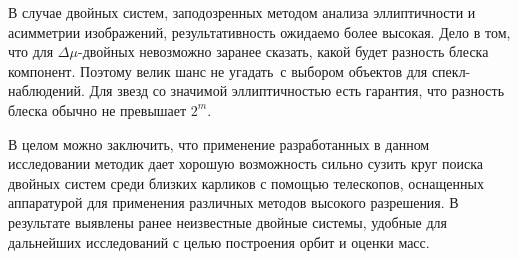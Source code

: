 В случае двойных систем, заподозренных методом анализа эллиптичности и асимметрии изображений, результативность ожидаемо более высокая. Дело в том, что для $\Delta\mu$-двойных невозможно заранее сказать, какой будет разность блеска компонент. Поэтому велик шанс \glqq не угадать\grqq\ с выбором объектов для спекл-наблюдений. Для звезд со значимой эллиптичностью есть гарантия, что разность блеска обычно не превышает $2^m$. 

В целом можно заключить, что применение разработанных в данном исследовании методик дает хорошую возможность сильно сузить круг поиска двойных систем среди близких карликов с помощью телескопов, оснащенных аппаратурой для применения различных методов высокого разрешения. В результате выявлены ранее неизвестные двойные системы, удобные для дальнейших исследований с целью построения орбит и оценки масс.
